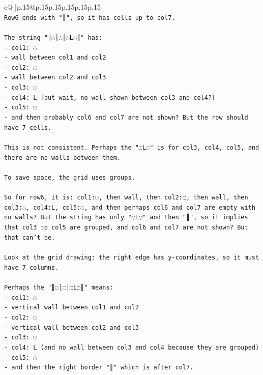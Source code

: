 \documentclass{article}
\begin{document}
{\begin{supertabular}{c@{$\;$}|p{.15\linewidth}@{}p{.15\linewidth}p{.15\linewidth}p{.15\linewidth}p{.15\linewidth}p{.15\linewidth}}
{{{\\ 
\texttt{Row6 ends with "║", so it has cells up to col7.} \\
\\ 
\texttt{The string "║◌│◌│◌L◌║" has:} \\
\texttt{{-} col1: ◌} \\
\texttt{{-} wall between col1 and col2} \\
\texttt{{-} col2: ◌} \\
\texttt{{-} wall between col2 and col3} \\
\texttt{{-} col3: ◌} \\
\texttt{{-} col4: L   {[}but wait, no wall shown between col3 and col4?{]}} \\
\texttt{{-} col5: ◌} \\
\texttt{{-} and then probably col6 and col7 are not shown? But the row should have 7 cells.} \\
\\ 
\texttt{This is not consistent. Perhaps the "◌L◌" is for col3, col4, col5, and there are no walls between them.} \\
\\ 
\texttt{To save space, the grid uses groups.} \\
\\ 
\texttt{So for row6, it is: col1:◌, then wall, then col2:◌, then wall, then col3:◌, col4:L, col5:◌, and then perhaps col6 and col7 are empty with no walls? But the string has only "◌L◌" and then "║", so it implies that col3 to col5 are grouped, and col6 and col7 are not shown? But that can't be.} \\
\\ 
\texttt{Look at the grid drawing: the right edge has y{-}coordinates, so it must have 7 columns.} \\
\\ 
\texttt{Perhaps the "║◌│◌│◌L◌║" means:} \\
\texttt{{-} col1: ◌} \\
\texttt{{-} vertical wall between col1 and col2} \\
\texttt{{-} col2: ◌} \\
\texttt{{-} vertical wall between col2 and col3} \\
\texttt{{-} col3: ◌} \\
\texttt{{-} col4: L  (and no wall between col3 and col4 because they are grouped)} \\
\texttt{{-} col5: ◌} \\
\texttt{{-} and then the right border "║" which is after col7.} \\
}}}
\end{supertabular}}
\end{document}
